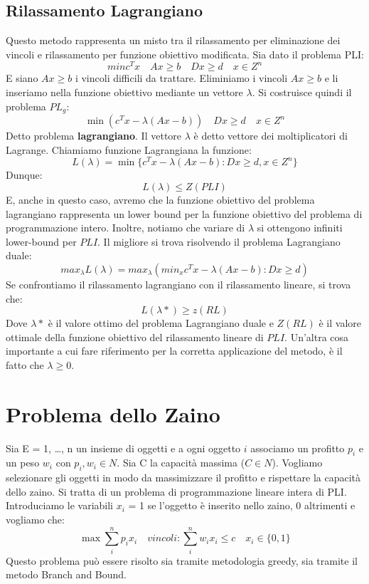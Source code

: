 \subsection{Rilassamento Lagrangiano}
Questo metodo rappresenta un misto tra il rilassamento per eliminazione dei vincoli e rilassamento per funzione obiettivo modificata. Sia dato il problema PLI:
\[min c^Tx \quad Ax \geq b \quad Dx \geq d \quad x \in Z ^n\] 
E siano $Ax \geq b$ i vincoli difficili da trattare. Eliminiamo i vincoli $Ax \geq b$ e li inseriamo nella funzione obiettivo mediante un vettore $\lambda$. Si costruisce quindi il problema $PL_g$:
\[\min(c^Tx - \lambda (Ax-b)) \quad Dx \geq d \quad x\in Z^n \] 
Detto problema \textbf{lagrangiano}. Il vettore $\lambda$ è detto vettore dei moltiplicatori di Lagrange. Chiamiamo funzione Lagrangiana la funzione:
\[L(\lambda) = \min\{c^Tx - \lambda(Ax-b): Dx \geq d, x \in Z^n\}\]
Dunque:
\[L(\lambda) \leq Z(PLI)\]
E, anche in questo caso, avremo che la funzione obiettivo del problema lagrangiano rappresenta un lower bound per la funzione obiettivo del problema di programmazione intero. Inoltre, notiamo che variare di $\lambda$ si ottengono infiniti lower-bound per $PLI$. Il migliore si trova risolvendo il problema Lagrangiano duale:
\[max_\lambda L(\lambda) = max_\lambda (min_x {c^Tx - \lambda(Ax-b): Dx \geq d})\]
Se confrontiamo il rilassamento lagrangiano con il rilassamento lineare, si trova che:
\[L(\lambda*) \geq z(RL)\]
Dove $\lambda*$ è il valore ottimo del problema Lagrangiano duale e $Z(RL)$ è il valore ottimale della funzione obiettivo del rilassamento lineare di $PLI$. Un'altra cosa importante a cui fare riferimento per la corretta applicazione del metodo, è il fatto che $\lambda \geq 0$.
\section{Problema dello Zaino}
Sia E = {1, \dots, n} un insieme di oggetti e a ogni oggetto $i$ associamo un profitto $p_i$ e un peso
$w_i$ con $p_i, w_i \in N$. Sia C la capacità massima ($C \in N$). Vogliamo selezionare gli oggetti in
modo da massimizzare il profitto e rispettare la capacità dello zaino.
Si tratta di un problema di programmazione lineare intera di PLI. Introduciamo le variabili $x_i$ = {1 se l'oggetto è inserito nello zaino, 0 altrimenti} e vogliamo che:
\[\max \sum_i^n p_i x_i \quad vincoli: \sum_i^n w_i x_i \leq c \quad x_i \in \{0,1\}\]
Questo problema può essere risolto sia tramite metodologia greedy, sia tramite il metodo Branch and Bound.
